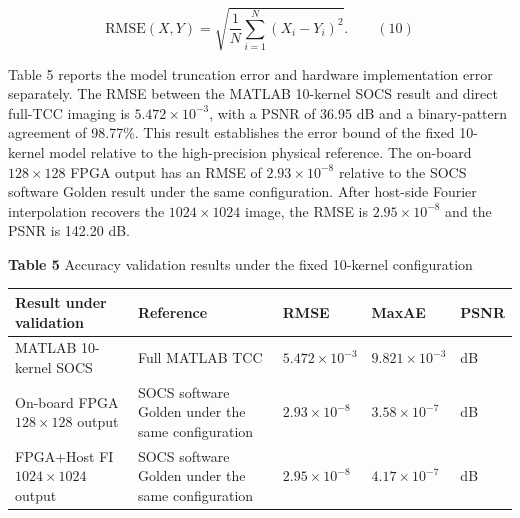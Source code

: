 \documentclass[
  preprint]{elsarticle}
\newcounter{none} %
\begin{document}
\[
\mathrm{RMSE}(X,Y)=\sqrt{\frac{1}{N}\sum_{i=1}^{N}(X_i-Y_i)^2}.
\qquad\mathrm{(10)}
\]

Table 5 reports the model truncation error and hardware implementation
error separately. The RMSE between the MATLAB 10-kernel SOCS result and
direct full-TCC imaging is \(5.472\times10^{-3}\), with a PSNR of 36.95
dB and a binary-pattern agreement of 98.77\%. This result establishes
the error bound of the fixed 10-kernel model relative to the
high-precision physical reference. The on-board \(128\times128\) FPGA
output has an RMSE of \(2.93\times10^{-8}\) relative to the SOCS
software Golden result under the same configuration. After host-side
Fourier interpolation recovers the \(1024\times1024\) image, the RMSE is
\(2.95\times10^{-8}\) and the PSNR is 142.20 dB.

\textbf{Table 5} Accuracy validation results under the fixed 10-kernel
configuration

{\def\LTcaptype{none} %
\begin{longtable}[]{@{}
  >{\raggedright\arraybackslash}p{}
  >{\raggedright\arraybackslash}p{}
  >{\raggedleft\arraybackslash}p{}
  >{\raggedleft\arraybackslash}p{}
  >{\raggedleft\arraybackslash}p{}@{}}
\toprule\noalign{}
\begin{minipage}[b]{\linewidth}\raggedright
Result under validation
\end{minipage} & \begin{minipage}[b]{\linewidth}\raggedright
Reference
\end{minipage} & \begin{minipage}[b]{\linewidth}\raggedleft
RMSE
\end{minipage} & \begin{minipage}[b]{\linewidth}\raggedleft
MaxAE
\end{minipage} & \begin{minipage}[b]{\linewidth}\raggedleft
PSNR
\end{minipage} \\
\midrule\noalign{}
\endhead
\bottomrule\noalign{}
\endlastfoot
MATLAB 10-kernel SOCS & Full MATLAB TCC & \(5.472\times10^{-3}\) &
\(9.821\times10^{-3}\) & 36.95 dB \\
On-board FPGA \(128\times128\) output & SOCS software Golden under the
same configuration & \(2.93\times10^{-8}\) & \(3.58\times10^{-7}\) &
142.26 dB \\
FPGA+Host FI \(1024\times1024\) output & SOCS software Golden under the
same configuration & \(2.95\times10^{-8}\) & \(4.17\times10^{-7}\) &
142.20 dB \\
\end{longtable}
}
\end{document}
